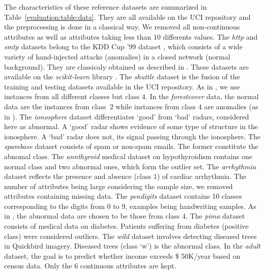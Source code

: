 


The characteristics of these reference datasets are summarized in Table~\ref{evaluation:table:data}. They are all available on the UCI repository \cite{Lichman2013} and the preprocessing is done in a classical way. %
We removed all non-continuous attributes as well as attributes taking less than $10$ differents values.
%
The \emph{http} and \emph{smtp} datasets belong to the KDD Cup '99 dataset \cite{KDD99,Tavallaee2009}, which consists of a wide variety of hand-injected  attacks (anomalies) in a closed network (normal background). They are classicaly obtained as described in \cite{Yamanishi2000}. These datasets are available on the \emph{scikit-learn} library \cite{sklearn2011}.
The \emph{shuttle} dataset is the fusion of the training and testing datasets available in the UCI repository. As in \cite{Liu2008}, we use instances from all different classes but class $4$. %
In the \emph{forestcover} data, the normal data are the instances from class~$2$ while instances from class $4$ are anomalies (as in \cite{Liu2008}). %
The \emph{ionosphere} dataset differentiates `good' from `bad' radars, considered here as abnormal. A `good' radar shows evidence of some type of structure in the ionosphere. A `bad' radar does not, its signal passing through the ionosphere.
The \emph{spambase} dataset consists of spam or non-spam emails. The former constitute the abnomal class.
The \emph{annthyroid} medical dataset on hypothyroidism contains one normal class and two abnormal ones, which form the outlier set.
The \emph{arrhythmia} dataset reflects the presence and absence (class $1$) of cardiac arrhythmia. The number of attributes being large considering the sample size, we removed attributes containing missing data.
The \emph{pendigits} dataset contains 10 classes corresponding to the digits from 0 to 9, examples being handwriting samples. As in \cite{Schubert2012}, the abnormal data are chosen to be those from class 4.
The \emph{pima} dataset consists of medical data on diabetes. Patients suffering from diabetes (positive class) were considered outliers.
The \emph{wild} dataset involves detecting diseased trees in Quickbird imagery. Diseased trees (class `w') is the abnormal class.
In the \emph{adult} dataset, the goal is to predict whether income exceeds \$ 50K/year based on census data. Only the 6 continuous attributes are kept.

